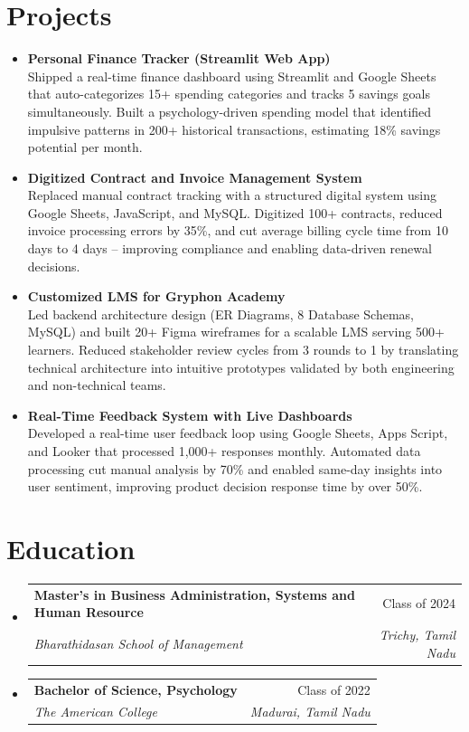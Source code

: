 \documentclass[letterpaper,11pt]{article}
\makeatletter
\newcommand{\resumeSubheading}[4]{
  \vspace{-2pt}\item
    \begin{tabular*}{0.97\textwidth}[t]{l@{\extracolsep{\fill}}r}
      \textbf{#1} & #2 \\
      \textit{\small#3} & \textit{\small #4} \\
    \end{tabular*}\vspace{-7pt}
}
\newcommand{\resumeSubHeadingListStart}{\begin{itemize}[leftmargin=0.15in, label={}]}
\newcommand{\resumeSubHeadingListEnd}{\end{itemize}}
\makeatother
\begin{document}
\section{Projects}
\begin{itemize}[leftmargin=0.15in, label={}]

\item \textbf{Personal Finance Tracker (Streamlit Web App)} \\
\small{Shipped a real-time finance dashboard using Streamlit and Google Sheets that auto-categorizes 15+ spending categories and tracks 5 savings goals simultaneously. Built a psychology-driven spending model that identified impulsive patterns in 200+ historical transactions, estimating 18\% savings potential per month.}
\vspace{0.4em}

\item \textbf{Digitized Contract and Invoice Management System} \\
\small{Replaced manual contract tracking with a structured digital system using Google Sheets, JavaScript, and MySQL. Digitized 100+ contracts, reduced invoice processing errors by 35\%, and cut average billing cycle time from 10 days to 4 days -- improving compliance and enabling data-driven renewal decisions.}
\vspace{0.4em}

\item \textbf{Customized LMS for Gryphon Academy} \\
\small{Led backend architecture design (ER Diagrams, 8 Database Schemas, MySQL) and built 20+ Figma wireframes for a scalable LMS serving 500+ learners. Reduced stakeholder review cycles from 3 rounds to 1 by translating technical architecture into intuitive prototypes validated by both engineering and non-technical teams.}
\vspace{0.4em}

\item \textbf{Real-Time Feedback System with Live Dashboards} \\
\small{Developed a real-time user feedback loop using Google Sheets, Apps Script, and Looker that processed 1,000+ responses monthly. Automated data processing cut manual analysis by 70\% and enabled same-day insights into user sentiment, improving product decision response time by over 50\%.}

\end{itemize}

\section{Education}
  \resumeSubHeadingListStart
    \resumeSubheading
      {Master's in Business Administration, Systems and Human Resource}{Class of 2024}
      {Bharathidasan School of Management}{Trichy, Tamil Nadu}
    \resumeSubheading
      {Bachelor of Science, Psychology}{Class of 2022}
      {The American College}{Madurai, Tamil Nadu}
  \resumeSubHeadingListEnd
\end{document}
